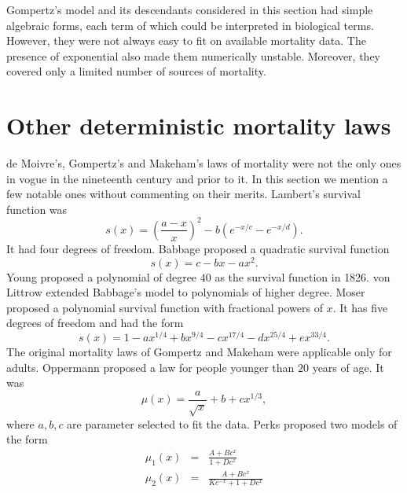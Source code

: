 \documentclass{article}
\numberwithin{equation}{section}
\begin{document}
Gompertz's model and its descendants considered in this section had simple
algebraic forms, each term of which could be interpreted in biological
terms. However, they were not always easy to fit on available mortality
data. The presence of exponential also made them numerically unstable. 
Moreover, they covered only a limited number of sources of mortality.

\section{Other deterministic mortality laws}\label{s4}
de Moivre's, Gompertz's and Makeham's laws of mortality were not the only
ones in vogue in the nineteenth century and prior to it. In this section we
mention a few notable ones without commenting on their merits. Lambert's
survival function \cite{lambert1776dottrina} was
\begin{equation}\label{s4e1}
s(x) = \left(\frac{a - x}{x}\right)^2 - b\left(e^{-x/c} - e^{-x/d}\right).
\end{equation}
It had four degrees of freedom. Babbage\cite{babbage1823tables} proposed a 
quadratic survival function
\begin{equation}\label{s4e2}
s(x) = c - bx - ax^2.
\end{equation}
Young proposed a polynomial of degree $40$ as the survival function in 
\cite{adler1866memoir} 1826. von Littrow\cite{von1832lebensversicherungen}
extended Babbage's model to polynomials of higher degree. Moser
\cite{moser1839gesetze} proposed a polynomial survival function with 
fractional powers of $x$. It has five degrees of freedom and had the form
\begin{equation}\label{s4e3}
s(x) = 1 - ax^{1/4} + bx^{9/4} - cx^{17/4} - dx^{25/4} + ex^{33/4}.
\end{equation}
The original mortality laws of Gompertz and Makeham were applicable only
for adults. Oppermann proposed \cite{oppermann1870graduation} a law for people 
younger than $20$ years of age. It was
\begin{equation}\label{s4e4}
\mu(x) = \frac{a}{\sqrt{x}} + b + cx^{1/3},
\end{equation}
where $a, b, c$ are parameter selected to fit the data. Perks 
\cite{perks1932some} proposed two models of the form
\begin{eqnarray}
\mu_1(x) &=& \frac{A + Bc^x}{1 + Dc^x} \label{s4e5} \\
\mu_2(x) &=& \frac{A + Bc^x}{Kc^{-x} + 1 + Dc^x} \label{s4e6}
\end{eqnarray}
\end{document}
